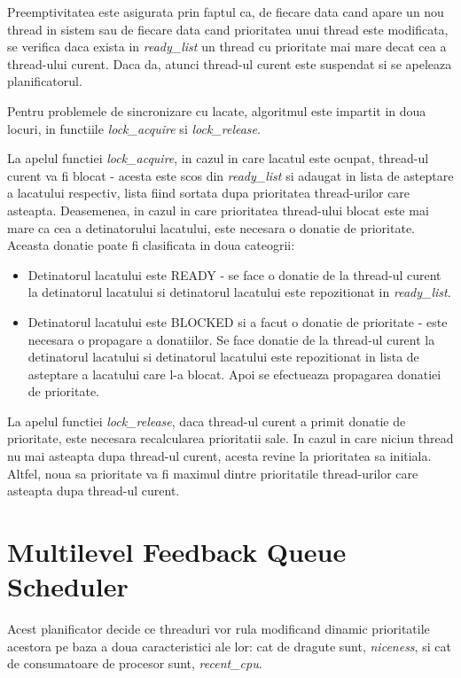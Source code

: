 \documentclass[a4paper,12pt]{report}
\begin{document}
Preemptivitatea este asigurata prin faptul ca, de fiecare data cand apare un nou thread in sistem sau de fiecare data 
cand prioritatea unui thread este modificata, se verifica daca exista in \textit{ready\_list} un thread cu prioritate
mai mare decat cea a thread-ului curent. Daca da, atunci thread-ul curent este suspendat si se apeleaza planificatorul.

Pentru problemele de sincronizare cu lacate, algoritmul este impartit in doua locuri, in functiile \textit{lock\_acquire}
si \textit{lock\_release}.

La apelul functiei \textit{lock\_acquire}, in cazul in care lacatul este ocupat, thread-ul curent va fi blocat - acesta
este scos din \textit{ready\_list} si adaugat in lista de asteptare a lacatului respectiv, lista fiind sortata dupa
prioritatea thread-urilor care asteapta. Deasemenea, in cazul in care prioritatea thread-ului blocat este mai mare ca 
cea a detinatorului lacatului, este necesara o donatie de prioritate. Aceasta donatie poate fi clasificata in doua cateogrii:
\begin{itemize}
 \item Detinatorul lacatului este READY - se face o donatie de la thread-ul curent la detinatorul lacatului si detinatorul 
 lacatului este repozitionat in \textit{ready\_list}.
 \item Detinatorul lacatului este BLOCKED si a facut o donatie de prioritate - este necesara o propagare a donatiilor. Se
 face donatie de la thread-ul curent la detinatorul lacatului si detinatorul lacatului este repozitionat in lista de asteptare
 a lacatului care l-a blocat. Apoi se efectueaza propagarea donatiei de prioritate.
\end{itemize}

La apelul functiei \textit{lock\_release}, daca thread-ul curent a primit donatie de prioritate, este necesara recalcularea 
prioritatii sale. In cazul in care niciun thread nu mai asteapta dupa thread-ul curent, acesta revine la prioritatea sa initiala. 
Altfel, noua sa prioritate va fi maximul dintre prioritatile thread-urilor care asteapta dupa thread-ul curent.

\section{Multilevel Feedback Queue Scheduler}
Acest planificator decide ce threaduri vor rula modificand dinamic prioritatile acestora pe baza a doua
caracteristici ale lor: cat de dragute sunt, \textit{niceness}, si cat de consumatoare de procesor sunt, \textit{recent\_cpu}.
\end{document}
